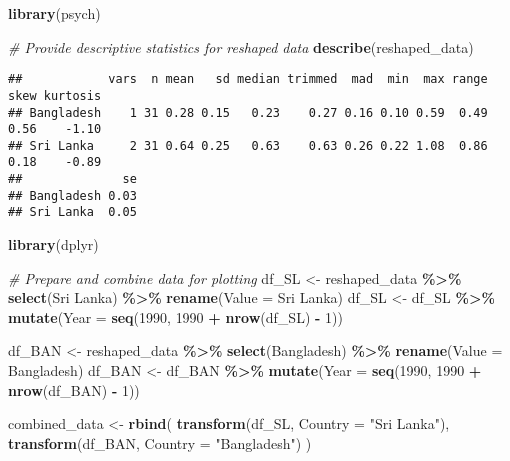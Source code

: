 \documentclass[
]{article}
\newenvironment{Shaded}{\begin{snugshade}}{\end{snugshade}}
\newcommand{\AttributeTok}[1]{\textcolor[rgb]{0.13,0.29,0.53}{#1}}
\newcommand{\CommentTok}[1]{\textcolor[rgb]{0.56,0.35,0.01}{\textit{#1}}}
\newcommand{\DecValTok}[1]{\textcolor[rgb]{0.00,0.00,0.81}{#1}}
\newcommand{\FunctionTok}[1]{\textcolor[rgb]{0.13,0.29,0.53}{\textbf{#1}}}
\newcommand{\NormalTok}[1]{#1}
\newcommand{\OtherTok}[1]{\textcolor[rgb]{0.56,0.35,0.01}{#1}}
\newcommand{\SpecialCharTok}[1]{\textcolor[rgb]{0.81,0.36,0.00}{\textbf{#1}}}
\newcommand{\StringTok}[1]{\textcolor[rgb]{0.31,0.60,0.02}{#1}}
\begin{document}
\begin{Shaded}
\begin{Highlighting}[]
\FunctionTok{library}\NormalTok{(psych)}

\CommentTok{\# Provide descriptive statistics for reshaped data}
\FunctionTok{describe}\NormalTok{(reshaped\_data)}
\end{Highlighting}
\end{Shaded}

\begin{verbatim}
##            vars  n mean   sd median trimmed  mad  min  max range skew kurtosis
## Bangladesh    1 31 0.28 0.15   0.23    0.27 0.16 0.10 0.59  0.49 0.56    -1.10
## Sri Lanka     2 31 0.64 0.25   0.63    0.63 0.26 0.22 1.08  0.86 0.18    -0.89
##              se
## Bangladesh 0.03
## Sri Lanka  0.05
\end{verbatim}

\begin{Shaded}
\begin{Highlighting}[]
\FunctionTok{library}\NormalTok{(dplyr)}

\CommentTok{\# Prepare and combine data for plotting}
\NormalTok{df\_SL }\OtherTok{\textless{}{-}}\NormalTok{ reshaped\_data }\SpecialCharTok{\%\textgreater{}\%}
  \FunctionTok{select}\NormalTok{(}\StringTok{\textasciigrave{}}\AttributeTok{Sri Lanka}\StringTok{\textasciigrave{}}\NormalTok{) }\SpecialCharTok{\%\textgreater{}\%}
  \FunctionTok{rename}\NormalTok{(}\AttributeTok{Value =} \StringTok{\textasciigrave{}}\AttributeTok{Sri Lanka}\StringTok{\textasciigrave{}}\NormalTok{)}
\NormalTok{df\_SL }\OtherTok{\textless{}{-}}\NormalTok{ df\_SL }\SpecialCharTok{\%\textgreater{}\%}
  \FunctionTok{mutate}\NormalTok{(}\AttributeTok{Year =} \FunctionTok{seq}\NormalTok{(}\DecValTok{1990}\NormalTok{, }\DecValTok{1990} \SpecialCharTok{+} \FunctionTok{nrow}\NormalTok{(df\_SL) }\SpecialCharTok{{-}} \DecValTok{1}\NormalTok{))}

\NormalTok{df\_BAN }\OtherTok{\textless{}{-}}\NormalTok{ reshaped\_data }\SpecialCharTok{\%\textgreater{}\%}
  \FunctionTok{select}\NormalTok{(}\StringTok{\textasciigrave{}}\AttributeTok{Bangladesh}\StringTok{\textasciigrave{}}\NormalTok{) }\SpecialCharTok{\%\textgreater{}\%}
  \FunctionTok{rename}\NormalTok{(}\AttributeTok{Value =} \StringTok{\textasciigrave{}}\AttributeTok{Bangladesh}\StringTok{\textasciigrave{}}\NormalTok{)}
\NormalTok{df\_BAN }\OtherTok{\textless{}{-}}\NormalTok{ df\_BAN }\SpecialCharTok{\%\textgreater{}\%}
  \FunctionTok{mutate}\NormalTok{(}\AttributeTok{Year =} \FunctionTok{seq}\NormalTok{(}\DecValTok{1990}\NormalTok{, }\DecValTok{1990} \SpecialCharTok{+} \FunctionTok{nrow}\NormalTok{(df\_BAN) }\SpecialCharTok{{-}} \DecValTok{1}\NormalTok{))}

\NormalTok{combined\_data }\OtherTok{\textless{}{-}} \FunctionTok{rbind}\NormalTok{(}
  \FunctionTok{transform}\NormalTok{(df\_SL, }\AttributeTok{Country =} \StringTok{"Sri Lanka"}\NormalTok{),}
  \FunctionTok{transform}\NormalTok{(df\_BAN, }\AttributeTok{Country =} \StringTok{"Bangladesh"}\NormalTok{)}
\NormalTok{)}
\end{Highlighting}
\end{Shaded}
\end{document}
